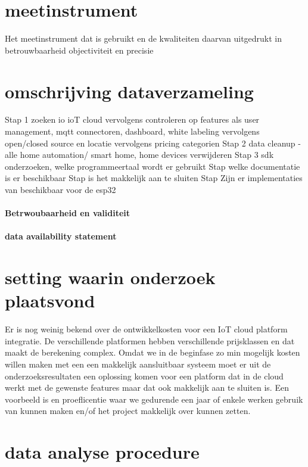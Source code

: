 \section{meetinstrument}
Het meetinstrument dat is gebruikt en de kwaliteiten daarvan uitgedrukt in betrouwbaarheid objectiviteit en precisie

\section{omschrijving dataverzameling}
Stap 1 zoeken io ioT cloud
vervolgens controleren op features als user management, mqtt connectoren, dashboard, white labeling
vervolgens open/closed source en locatie
vervolgens pricing categorien
Stap 2 data cleanup
- alle home automation/ smart home, home devices verwijderen
Stap 3
sdk onderzoeken, welke programmeertaal wordt er gebruikt 
Stap
welke documentatie is er beschikbaar
Stap
is het makkelijk aan te sluiten
Stap
Zijn er implementaties van beschikbaar voor de esp32

\paragraph{Betrwoubaarheid en validiteit}

\paragraph{data availability statement}

\section{setting waarin onderzoek plaatsvond}
Er is nog weinig bekend over de ontwikkelkosten voor een IoT cloud platform integratie. De verschillende platformen hebben verschillende prijsklassen en dat maakt de berekening complex. Omdat we in de beginfase zo min mogelijk kosten willen maken met een een makkelijk aansluitbaar systeem moet er uit de onderzoeksresultaten een oplossing komen voor een platform dat in de cloud werkt met de gewenste features maar dat ook makkelijk aan te sluiten is. Een voorbeeld is en proeflicentie waar we gedurende een jaar of enkele werken gebruik van kunnen maken en/of het project makkelijk over kunnen zetten.

\section{data analyse procedure}

